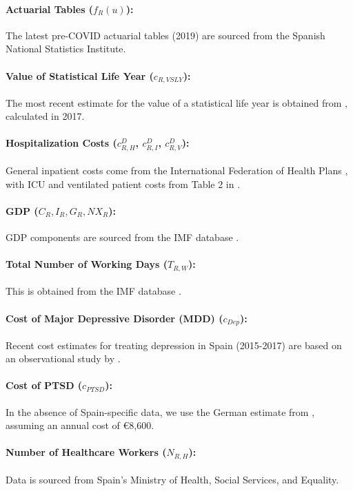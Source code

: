 \documentclass[msom,blindrev]{informs3} %
\begin{document}
\begin{APPENDICES}
\paragraph{Actuarial Tables ($f_R(u)$):} The latest pre-COVID actuarial tables (2019) are sourced from the Spanish National Statistics Institute.
\paragraph{Value of Statistical Life Year ($c_{R,VSLY}$):} The most recent estimate for the value of a statistical life year is obtained from , calculated in 2017.
\paragraph{Hospitalization Costs ($c^D_{R,H}$, $c^D_{R,I}$, $c^D_{R,V}$):} General inpatient costs come from the International Federation of Health Plans , with ICU and ventilated patient costs from Table 2 in .
\paragraph{GDP ($C_R, I_R, G_R, NX_R$):} GDP components are sourced from the IMF database .

\paragraph{Total Number of Working Days ($T_{R,W}$):} This is obtained from the IMF database .
\paragraph{Cost of Major Depressive Disorder (MDD) ($c_{Dep}$):} Recent cost estimates for treating depression in Spain (2015-2017) are based on an observational study by .
\paragraph{Cost of PTSD ($c_{PTSD}$):} In the absence of Spain-specific data, we use the German estimate from , assuming an annual cost of \euro8,600.
\paragraph{Number of Healthcare Workers ($N_{R,H}$):} Data is sourced from Spain’s Ministry of Health, Social Services, and Equality.

\end{APPENDICES}
\end{document}
